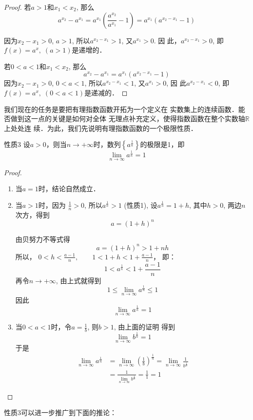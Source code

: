\begin{proof}
  若$a>1$和$x_1<x_2$, 那么
\[a^{x_2}-a^{x_1}=a^{x_1}\left(\frac{a^{x_2}}{a^{x_1}}-1\right)=a^{x_1}\left(a^{x_2-x_1}-1\right)\]
  
因为$x_2-x_1>0$, $a>1$, 所以$a^{x_2-x_1}>1$, 又$a^{x_1}>0$. 因
此，$a^{x_2-x_1}>0$, 即$f(x)=a^x,\; (a>1)$是递增的．

若$0<a<1$和$x_1<x_2$, 那么
\[a^{x_2}-a^{x_1}=a^{x_1}\left(a^{x_2-x_1}-1\right)\]
因为$x_2-x_1>0$, $0<a<1$, 所以$a^{x_2-x_1}<1$, 又$a^{x_1}>0$, 因
此$a^{x_2-x_1}<0$, 即$f(x)=a^x,\; (0<a<1)$是递减的．
\end{proof}

我们现在的任务是要把有理指数函数开拓为一个定义在
实数集上的连续函数．能否做到这一点的关键是如何对全体
无理点补充定义，使得指数函数在整个实数轴$\mathbb{R}$上处处连
续．为此，我们先说明有理指数函数的一个极限性质．


\begin{blk}{性质3}
  设$a>0$，则当$n\to +\infty$时，数列$\left\{a^{\tfrac{1}{n}}\right\}$的极限是1，即
  \[\lim_{n\to\infty}a^{\tfrac{1}{n}}=1\]
\end{blk}

\begin{proof}
\begin{enumerate}
  \item 当$a=1$时，结论自然成立．
  \item 当$a>1$时，因为
  $\frac{1}{n}>0$, 所以$a^{\tfrac{1}{n}}>1$ (性质1),
  设$a^{\tfrac{1}{n}}=1+h$, 其中$h>0$, 两边$n$次方，得到
 \[ a=(1+h)^n\]
 
 由贝努力不等式得
\[  a=(1+h)^n>1+nh\]
  所以，
$  0<h<\frac{a-1}{n},\qquad 1<1+h<1+\frac{a-1}{n}$，
  即：
\[1<a^{\tfrac{1}{n}}<1+\frac{a-1}{n}\]  
  再令$n\to +\infty$, 由上式就得到
\[1\le \lim_{n\to\infty}a^{\tfrac{1}{n}}\le 1 \]
  因此\[\lim_{n\to\infty}a^{\tfrac{1}{n}}=1\]
  \item 当$0<a<1$时，令$a=\frac{1}{b}$, 则$b>1$, 由上面的证明
  得到\[\lim_{n\to\infty}b^{\tfrac{1}{n}}=1\]
于是
\[\begin{split}
  \lim_{n\to\infty}a^{\tfrac{1}{n}}&=\lim_{n\to\infty}\left(\frac{1}{b}\right)^{\tfrac{1}{n}}=\lim_{n\to\infty}\frac{1}{b^{\tfrac{1}{n}}}\\
  &=\frac{1}{\displaystyle\lim_{n\to\infty}b^{\tfrac{1}{n}}}=\frac{1}{1}=1
\end{split}\]
\end{enumerate} 
\end{proof}

性质3可以进一步推广到下面的推论：

